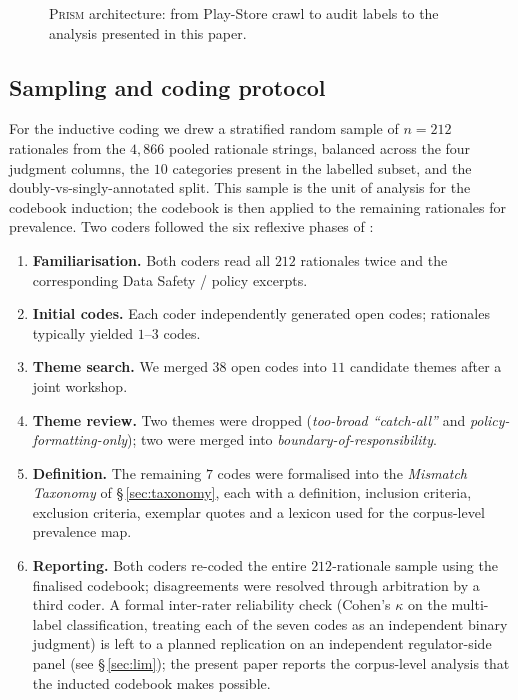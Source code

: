 \documentclass[11pt,a4paper]{article}
\newcommand{\prism}{\textsc{Prism}}
\begin{document}
\begin{figure}[t]
{%
}
\caption{\prism{} architecture: from Play-Store crawl to audit
labels to the analysis presented in this paper.}
\label{fig:arch}
\end{figure}

\subsection{Sampling and coding protocol}\label{sec:coding}
For the inductive coding we drew a stratified random sample of
$n=212$ rationales from the $4{,}866$ pooled rationale strings,
balanced across the four judgment columns, the $10$ categories
present in the labelled subset, and the doubly-vs-singly-annotated
split. This sample is the unit of analysis for the codebook
induction; the codebook is then applied to the remaining rationales
for prevalence. Two coders followed the six reflexive phases of
\citet{braun2006using}:

\begin{enumerate}[topsep=2pt,itemsep=2pt,leftmargin=1.5em]
\item\textbf{Familiarisation.} Both coders read all $212$ rationales
twice and the corresponding Data Safety / policy excerpts.
\item\textbf{Initial codes.} Each coder independently generated open
codes; rationales typically yielded $1$--$3$ codes.
\item\textbf{Theme search.} We merged $38$ open codes into $11$
candidate themes after a joint workshop.
\item\textbf{Theme review.} Two themes were dropped (\emph{too-broad
``catch-all''} and \emph{policy-formatting-only}); two were merged
into \emph{boundary-of-responsibility}.
\item\textbf{Definition.} The remaining $7$ codes were formalised
into the \emph{Mismatch Taxonomy} of \S\,\ref{sec:taxonomy}, each with
a definition, inclusion criteria, exclusion criteria, exemplar quotes
and a lexicon used for the corpus-level prevalence map.
\item\textbf{Reporting.} Both coders re-coded the entire $212$-rationale
sample using the finalised codebook; disagreements were resolved
through arbitration by a third coder. A formal inter-rater
reliability check (Cohen's $\kappa$ on the multi-label classification,
treating each of the seven codes as an independent binary judgment)
is left to a planned replication on an independent regulator-side
panel (see \S\,\ref{sec:lim}); the present paper reports the
corpus-level analysis that the inducted codebook makes possible.
\end{enumerate}
\end{document}
